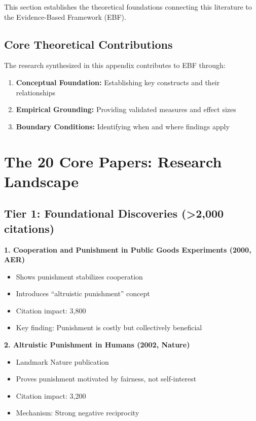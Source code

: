 \documentclass[11pt]{article}
\begin{document}
This section establishes the theoretical foundations connecting this literature
to the Evidence-Based Framework (EBF).

\subsection{Core Theoretical Contributions}

The research synthesized in this appendix contributes to EBF through:

\begin{enumerate}
    \item \textbf{Conceptual Foundation:} Establishing key constructs and their relationships
    \item \textbf{Empirical Grounding:} Providing validated measures and effect sizes
    \item \textbf{Boundary Conditions:} Identifying when and where findings apply
\end{enumerate}

\section*{The 20 Core Papers: Research Landscape}

\subsection*{Tier 1: Foundational Discoveries (>2,000 citations)}

\textbf{1. Cooperation and Punishment in Public Goods Experiments (2000, AER)}
\begin{itemize}
    \item Shows punishment stabilizes cooperation
    \item Introduces ``altruistic punishment'' concept
    \item Citation impact: 3,800
    \item Key finding: Punishment is costly but collectively beneficial
\end{itemize}

\textbf{2. Altruistic Punishment in Humans (2002, Nature)}
\begin{itemize}
    \item Landmark Nature publication
    \item Proves punishment motivated by fairness, not self-interest
    \item Citation impact: 3,200
    \item Mechanism: Strong negative reciprocity
\end{itemize}
\end{document}
